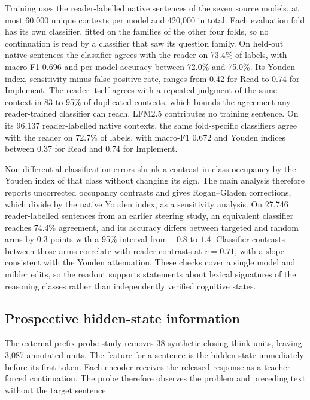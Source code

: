 Training uses the reader-labelled native sentences of the seven source models, at most 60,000 unique contexts per model and 420,000 in total.
%
Each evaluation fold has its own classifier, fitted on the families of the other four folds, so no continuation is read by a classifier that saw its question family.
%
On held-out native sentences the classifier agrees with the reader on 73.4\% of labels, with macro-F1 0.696 and per-model accuracy between 72.0\% and 75.0\%.
%
Its Youden index, sensitivity minus false-positive rate, ranges from 0.42 for Read to 0.74 for Implement.
%
The reader itself agrees with a repeated judgment of the same context in 83 to 95\% of duplicated contexts, which bounds the agreement any reader-trained classifier can reach.
%
LFM2.5 contributes no training sentence.
%
On its 96,137 reader-labelled native contexts, the same fold-specific classifiers agree with the reader on 72.7\% of labels, with macro-F1 0.672 and Youden indices between 0.37 for Read and 0.74 for Implement.
%

Non-differential classification errors shrink a contrast in class occupancy by the Youden index of that class without changing its sign.
%
The main analysis therefore reports uncorrected occupancy contrasts and gives Rogan--Gladen corrections, which divide by the native Youden index, as a sensitivity analysis.
%
On 27,746 reader-labelled sentences from an earlier steering study, an equivalent classifier reaches 74.4\% agreement, and its accuracy differs between targeted and random arms by 0.3 points with a 95\% interval from $-0.8$ to $1.4$.
%
Classifier contrasts between those arms correlate with reader contrasts at $r=0.71$, with a slope consistent with the Youden attenuation.
%
These checks cover a single model and milder edits, so the readout supports statements about lexical signatures of the reasoning classes rather than independently verified cognitive states.
%

\subsection{Prospective hidden-state information}
\label{app:probes}

The external prefix-probe study removes 38 synthetic closing-think units, leaving 3,087 annotated units.
%
The feature for a sentence is the hidden state immediately before its first token.
%
Each encoder receives the released response as a teacher-forced continuation.
%
The probe therefore observes the problem and preceding text without the target sentence.
%

